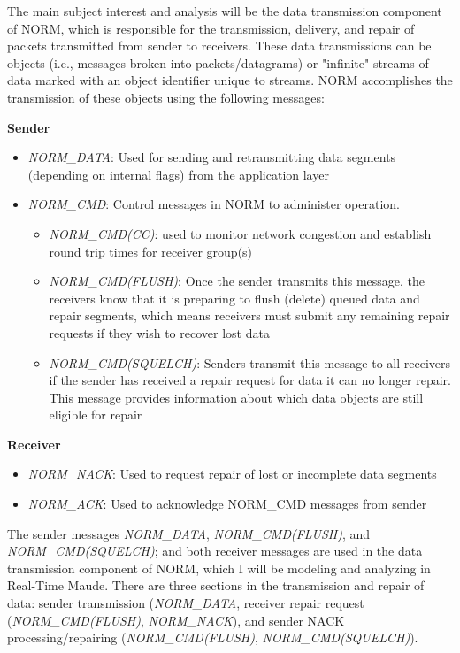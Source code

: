 \documentclass[10pt, journal]{IEEEtran}
\begin{document}
The main subject interest and analysis will be the data transmission component of NORM, which is responsible for the transmission, delivery, and repair of packets transmitted from sender to receivers. These data transmissions can be objects (i.e., messages broken into packets/datagrams) or "infinite" streams of data marked with an object identifier unique to streams. NORM accomplishes the transmission of these objects using the following messages:

\textbf{Sender}
\begin{itemize}
	\item \textit{NORM\_DATA}: Used for sending and retransmitting data segments (depending on internal flags) from the application layer
	\item \textit{NORM\_CMD}: Control messages in NORM to administer operation.
	\begin{itemize}
		\item \textit{NORM\_CMD(CC)}: used to monitor network congestion and establish round trip times for receiver group(s)
		\item \textit{NORM\_CMD(FLUSH)}: Once the sender transmits this message, the receivers know that it is preparing to flush (delete) queued data and repair segments, which means receivers must submit any remaining repair requests if they wish to recover lost data
		\item \textit{NORM\_CMD(SQUELCH)}: Senders transmit this message to all receivers if the sender has received a repair request for data it can no longer repair. This message provides information about which data objects are still eligible for repair
	\end{itemize}
\end{itemize}

\textbf{Receiver}
\begin{itemize}
	\item \textit{NORM\_NACK}: Used to request repair of lost or incomplete data segments
	\item \textit{NORM\_ACK}: Used to acknowledge NORM\_CMD messages from sender
\end{itemize}

The sender messages \textit{NORM\_DATA}, \textit{NORM\_CMD(FLUSH)}, and \textit{NORM\_CMD(SQUELCH)}; and both receiver messages are used in the data transmission component of NORM, which I will be modeling and analyzing in Real-Time Maude. There are three sections in the transmission and repair of data: sender transmission (\textit{NORM\_DATA}, receiver repair request (\textit{NORM\_CMD(FLUSH)}, \textit{NORM\_NACK}), and sender NACK processing/repairing (\textit{NORM\_CMD(FLUSH)}, \textit{NORM\_CMD(SQUELCH)}).
\end{document}
